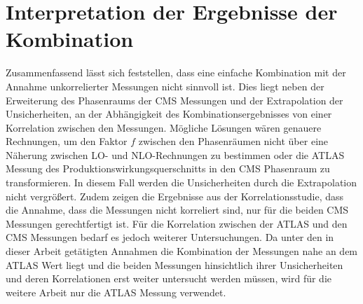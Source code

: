 \section{Interpretation der Ergebnisse der Kombination}
Zusammenfassend lässt sich feststellen, dass eine einfache Kombination mit der Annahme unkorrelierter Messungen nicht sinnvoll ist. Dies liegt neben der Erweiterung des Phasenraums der CMS Messungen und der Extrapolation der Unsicherheiten, an der Abhängigkeit des Kombinationsergebnisses von einer Korrelation zwischen den Messungen.
Mögliche Lösungen wären genauere Rechnungen, um den Faktor $f$ zwischen den Phasenräumen nicht über eine Näherung zwischen LO- und NLO-Rechnungen zu bestimmen oder die ATLAS Messung des Produktionswirkungsquerschnitts in den CMS Phasenraum zu transformieren. In diesem Fall werden die Unsicherheiten durch die Extrapolation nicht vergrößert.
Zudem zeigen die Ergebnisse aus der Korrelationsstudie, dass die Annahme, dass die Messungen nicht korreliert sind, nur für die beiden CMS Messungen gerechtfertigt ist. Für die Korrelation zwischen der ATLAS und den CMS Messungen bedarf es jedoch weiterer Untersuchungen.
Da unter den in dieser Arbeit getätigten Annahmen die Kombination der Messungen nahe an dem ATLAS Wert liegt und die beiden Messungen hinsichtlich ihrer Unsicherheiten und deren Korrelationen erst weiter untersucht werden müssen, wird für die weitere Arbeit nur die ATLAS Messung verwendet.
%
%
